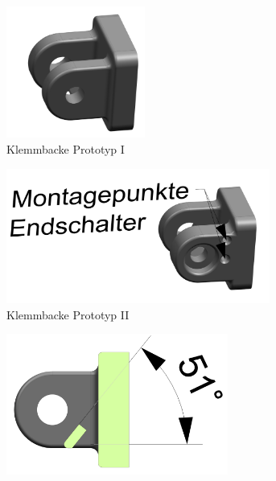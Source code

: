 \begin{figure}[H]
\begin{subfigure}{0.49\textwidth}
\includegraphics[width=0.5\textwidth]{assets/greifer-prototyp/Backe_alt_trimetrisch.png}
\caption{Klemmbacke Prototyp I}
\label{fig:jaw_old_trimetric}
\end{subfigure}
\begin{subfigure}{0.49\textwidth}
\includegraphics[width=0.95\textwidth]{assets/greifer-prototyp/Backe_neu_trimetrisch.png}
\caption{Klemmbacke Prototyp II}
\label{fig:jaw_new_trimetric}
\end{subfigure}
\begin{subfigure}{0.49\textwidth}
\includegraphics[width=0.8\textwidth]{assets/greifer-prototyp/Backe_alt_schnitt.png}

\end{subfigure}
\end{figure}
